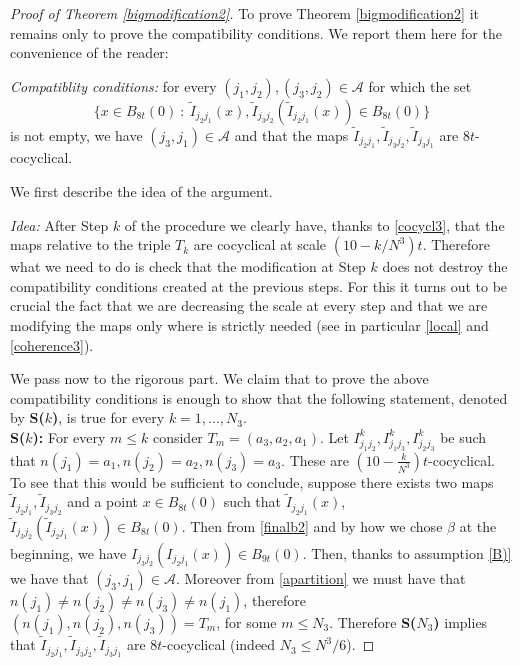 \documentclass[11pt]{article}
\theoremstyle{plain}
\theoremstyle{definition}
\numberwithin{equation}{section}
\begin{document}
\begin{proof}[Proof of Theorem \ref{bigmodification2}]
	\medskip
{}
	
	To prove Theorem \ref{bigmodification2} it remains only to prove the compatibility conditions. We report them here for the convenience of the reader:
	
	\noindent\emph{Compatiblity conditions:} for every $(j_1,j_2),(j_3,j_2)\in \mathcal{A}$ for which the set  $$\{x \in B_{8t}(0) \ : \  \tilde I_{j_2j_1}(x),\tilde I_{j_3j_2}(\tilde I_{j_2j_1}(x))\in B_{8t}(0)\}$$ is not empty, we have $(j_3,j_1)\in \mathcal{A}$ and that the maps $\tilde I_{j_2j_1},\tilde I_{j_3j_2},\tilde I_{j_3j_1}$ are $8t$-cocyclical.
	
	
	\medskip
	
	We first describe the  idea of the argument.
	
	\noindent\emph{Idea:}  After  Step $k$ of the procedure we clearly have, thanks to \eqref{cocycl3},  that the maps relative to the triple $T_k$ are cocyclical at scale $(10-k/N^3)t$. Therefore what we need to do is check that the modification at Step $k$ does not destroy the compatibility conditions created at the previous steps. For this it turns out to be crucial the fact that we are decreasing the scale at every step and   that we are modifying the maps only where is strictly needed (see in particular \eqref{local} and \eqref{coherence3}).
	
	\medskip
	We pass now to the rigorous part. We claim that to prove the above compatibility conditions is enough to show that the following statement, denoted by {\bf{S($k$)}}, is true for every $k=1,...,{N_3}.$\\
	
	{\bf{S($k$):}} For every $m \le k$ consider $T_m=(a_3,a_2,a_1)$. Let $I^k_{j_1j_2},I^k_{j_1j_3},I^k_{j_2j_3}$ be such that $n(j_1)=a_1 , n(j_2)=a_2 ,n(j_3)=a_3$. These are $(10-\frac{k}{N^3})t$-cocyclical.\\
	

	 
	To see that this would be sufficient to conclude, suppose there exists two maps $\tilde I_{j_2j_1},\tilde I_{j_3j_2}$ and a point $x \in B_{8t}(0)$ such that $\tilde I_{j_2j_1}(x)$, $\tilde I_{j_3j_2}(\tilde I_{j_2j_1}(x))\in B_{8 t}(0)$. Then from \eqref{finalb2} and by how we chose  $\beta$ at the beginning, we have $I_{j_3j_2}( I_{j_2j_1}(x))\in B_{9t}(0)$. Then, thanks to assumption \ref{B)} we have that $(j_3,j_1)\in \mathcal{A}$. Moreover from \eqref{apartition} we must have that $n(j_1)\neq n(j_2)\neq n(j_3)\neq n(j_1)$, therefore $(n(j_1), n(j_2), n(j_3))=T_m$, for some $m\le {N_3}$. Therefore  {\bf{S($N_3$)}} implies that $\tilde I_{j_2j_1},\tilde I_{j_3j_2}, \tilde I_{j_3j_1}$ are $8t$-cocyclical (indeed $N_3\le N^3/6$).
	

\end{proof}
\end{document}
